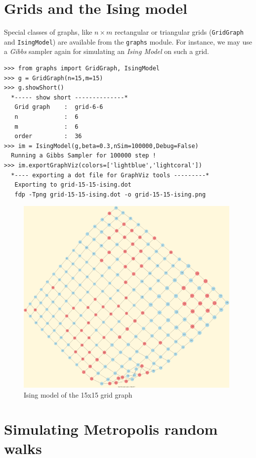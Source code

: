 \section{Grids and the Ising model}
\label{sec:22.5}

Special classes of graphs, like $n \times m$ rectangular or triangular grids (\texttt{GridGraph} and \texttt{IsingModel}) are available from the \texttt{graphs} module. For instance, we may use a \emph{Gibbs} sampler again for simulating an \emph{Ising Model} on such a grid.
\begin{lstlisting}
>>> from graphs import GridGraph, IsingModel
>>> g = GridGraph(n=15,m=15)
>>> g.showShort()
  *----- show short --------------*
   Grid graph    :  grid-6-6
   n             :  6
   m             :  6
   order         :  36
>>> im = IsingModel(g,beta=0.3,nSim=100000,Debug=False)
  Running a Gibbs Sampler for 100000 step !
>>> im.exportGraphViz(colors=['lightblue','lightcoral'])
  *---- exporting a dot file for GraphViz tools ---------*
   Exporting to grid-15-15-ising.dot
   fdp -Tpng grid-15-15-ising.dot -o grid-15-15-ising.png
\end{lstlisting}
\begin{figure}[h]
\sidecaption
\includegraphics[width=11cm]{Figures/grid-15-15-ising.png}
\caption{Ising model of the 15x15 grid graph} 
\label{fig:22.5}       %
\end{figure}

\section{Simulating Metropolis random walks}
\label{sec:22.6}

